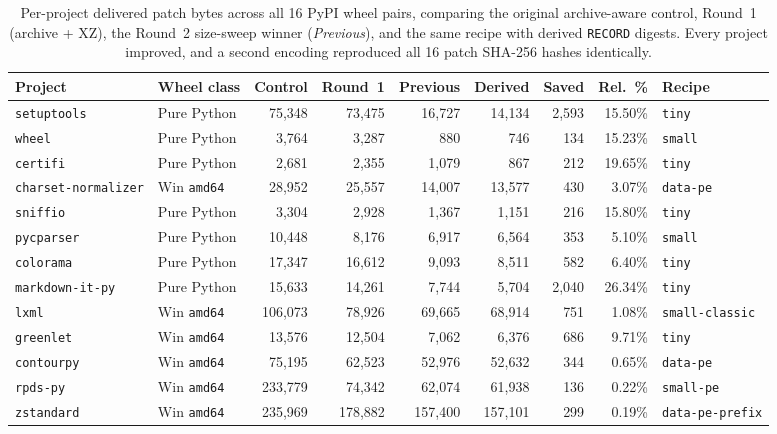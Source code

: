 \documentclass[10pt,letterpaper]{article}
\theoremstyle{remark}
\begin{document}
\begin{table}[htbp]
\centering
\caption{Per-project delivered patch bytes across all 16 PyPI wheel pairs, comparing the original archive-aware control, Round~1 (archive + XZ), the Round~2 size-sweep winner (\emph{Previous}), and the same recipe with derived \texttt{RECORD} digests. Every project improved, and a second encoding reproduced all 16 patch SHA-256 hashes identically.}
\label{tab:projects}
\smallskip
\footnotesize
\setlength{\tabcolsep}{4.8pt}
\begin{tabular}{@{}llrrrrrrl@{}}
\toprule
\textbf{Project} & \textbf{Wheel class} & \textbf{Control} & \textbf{Round~1} & \textbf{Previous} & \textbf{Derived} & \textbf{Saved} & \textbf{Rel.\ \%} & \textbf{Recipe} \\
\midrule
\texttt{setuptools} & Pure Python & 75,348 & 73,475 & 16,727 & 14,134 & 2,593 & 15.50\% & \texttt{tiny} \\
\texttt{wheel} & Pure Python & 3,764 & 3,287 & 880 & 746 & 134 & 15.23\% & \texttt{small} \\
\texttt{certifi} & Pure Python & 2,681 & 2,355 & 1,079 & 867 & 212 & 19.65\% & \texttt{tiny} \\
\texttt{charset-normalizer} & Win \texttt{amd64} & 28,952 & 25,557 & 14,007 & 13,577 & 430 & 3.07\% & \texttt{data-pe} \\
\texttt{sniffio} & Pure Python & 3,304 & 2,928 & 1,367 & 1,151 & 216 & 15.80\% & \texttt{tiny} \\
\texttt{pycparser} & Pure Python & 10,448 & 8,176 & 6,917 & 6,564 & 353 & 5.10\% & \texttt{small} \\
\texttt{colorama} & Pure Python & 17,347 & 16,612 & 9,093 & 8,511 & 582 & 6.40\% & \texttt{tiny} \\
\texttt{markdown-it-py} & Pure Python & 15,633 & 14,261 & 7,744 & 5,704 & 2,040 & 26.34\% & \texttt{tiny} \\
\texttt{lxml} & Win \texttt{amd64} & 106,073 & 78,926 & 69,665 & 68,914 & 751 & 1.08\% & \texttt{small-classic} \\
\texttt{greenlet} & Win \texttt{amd64} & 13,576 & 12,504 & 7,062 & 6,376 & 686 & 9.71\% & \texttt{tiny} \\
\texttt{contourpy} & Win \texttt{amd64} & 75,195 & 62,523 & 52,976 & 52,632 & 344 & 0.65\% & \texttt{data-pe} \\
\texttt{rpds-py} & Win \texttt{amd64} & 233,779 & 74,342 & 62,074 & 61,938 & 136 & 0.22\% & \texttt{small-pe} \\
\texttt{zstandard} & Win \texttt{amd64} & 235,969 & 178,882 & 157,400 & 157,101 & 299 & 0.19\% & \texttt{data-pe-prefix} \\

\end{tabular}
\end{table}
\end{document}
